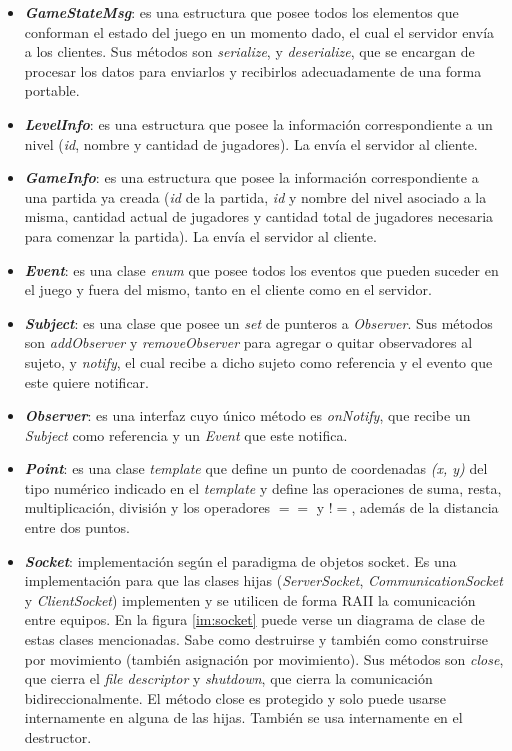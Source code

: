 \begin{itemize}
	\item \textbf{\textit{GameStateMsg}}: es una estructura que posee todos los elementos que conforman el estado del juego en un momento dado, el cual el servidor envía a los clientes. Sus métodos son \textit{serialize}, y \textit{deserialize}, que se encargan de procesar los datos para enviarlos y recibirlos adecuadamente de una forma portable.
	
	\item \textbf{\textit{LevelInfo}}: es una estructura que posee la información correspondiente a un nivel (\textit{id}, nombre y cantidad de jugadores). La envía el servidor al cliente.
	
	\item \textbf{\textit{GameInfo}}: es una estructura que posee la información correspondiente a una partida ya creada (\textit{id} de la partida, \textit{id} y nombre del nivel asociado a la misma, cantidad actual de jugadores y cantidad total de jugadores necesaria para comenzar la partida). La envía el servidor al cliente.
	
	\item \textbf{\textit{Event}}: es una clase \textit{enum} que posee todos los eventos que pueden suceder en el juego y fuera del mismo, tanto en el cliente como en el servidor.
	
	\item \textbf{\textit{Subject}}: es una clase que posee un \textit{set} de punteros a \textit{Observer}. Sus métodos son \textit{addObserver} y \textit{removeObserver} para agregar o quitar observadores al sujeto, y \textit{notify}, el cual recibe a dicho sujeto como referencia y el evento que este quiere notificar.
	
	\item \textbf{\textit{Observer}}: es una interfaz cuyo único método es \textit{onNotify}, que recibe un \textit{Subject} como referencia y un \textit{Event} que este notifica.
	
	\item \textbf{\textit{Point}}: es una clase \textit{template} que define un punto de coordenadas \textit{(x, y)} del tipo numérico indicado en el \textit{template} y define las operaciones de suma, resta, multiplicación, división y los operadores $==$ y  $!=$, además de la distancia entre dos puntos.
	
	\item \textbf{\textit{Socket}}: implementación según el paradigma de objetos socket. Es una implementación para que las clases hijas (\emph{ServerSocket}, \emph{CommunicationSocket} y \emph{ClientSocket}) implementen y se utilicen de forma RAII la comunicación entre equipos. En la figura \ref{im:socket} puede verse un diagrama de clase de estas clases mencionadas. Sabe como destruirse y también como construirse por movimiento (también asignación por movimiento). Sus métodos son \textit{close}, que cierra el \textit{file descriptor} y \textit{shutdown}, que cierra la comunicación bidireccionalmente. El método close es protegido y solo puede usarse internamente en alguna de las hijas. También se usa internamente en el destructor.
	

\end{itemize}

